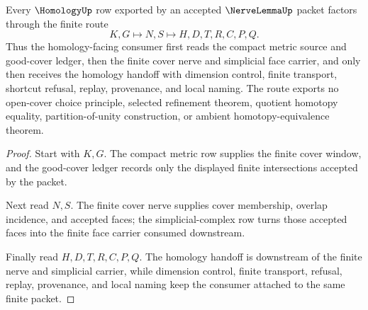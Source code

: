 \begin{theorem}
\label{thm:nerve-lemma-finite-cover-homology-handoff}
Every $\HomologyUp$ row exported by an accepted $\NerveLemmaUp$ packet factors through the finite route
$$
K,G \longmapsto N,S \longmapsto H,D,T,R,C,P,Q .
$$
Thus the homology-facing consumer first reads the compact metric source and good-cover ledger, then the finite cover nerve and simplicial face carrier, and only then receives the homology handoff with dimension control, finite transport, shortcut refusal, replay, provenance, and local naming. The route exports no open-cover choice principle, selected refinement theorem, quotient homotopy equality, partition-of-unity construction, or ambient homotopy-equivalence theorem.
\end{theorem}
\begin{proof}
Start with $K,G$. The compact metric row supplies the finite cover window, and the good-cover ledger records only the displayed finite intersections accepted by the packet.

Next read $N,S$. The finite cover nerve supplies cover membership, overlap incidence, and accepted faces; the simplicial-complex row turns those accepted faces into the finite face carrier consumed downstream.

Finally read $H,D,T,R,C,P,Q$. The homology handoff is downstream of the finite nerve and simplicial carrier, while dimension control, finite transport, refusal, replay, provenance, and local naming keep the consumer attached to the same finite packet.
\end{proof}


\begin{closurestatus}{\NerveLemmaUp}
  \theoryclosure{\seedClosure}
  \formalstatus{\unformalizedV}
\end{closurestatus}

